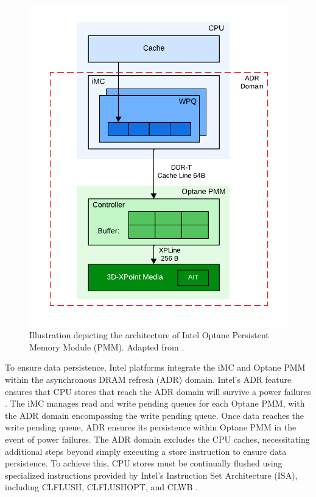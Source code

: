 \begin{figure}[ht]
    \centering
    \includegraphics[scale=0.7]{images/optane-communication.png}
    \caption[Intel Optane Persistent Memory Module Architecture]{Illustration depicting the architecture of Intel Optane Persistent Memory Module (PMM). Adapted from \cite{yang2020empirical}.}
    \label{fig:optane_communication}
\end{figure}

To ensure data persistence, Intel platforms integrate the iMC and Optane PMM within the asynchronous DRAM refresh (ADR) domain. Intel's ADR feature ensures that CPU stores that reach the ADR domain will survive a power failures \cite{yang2020empirical}. The iMC manages read and write pending queues for each Optane PMM, with the ADR domain encompassing the write pending queue. Once data reaches the write pending queue, ADR ensures its persistence within Optane PMM in the event of power failures. The ADR domain excludes the CPU caches, necessitating additional steps beyond simply executing a store instruction to ensure data persistence. To achieve this, CPU stores must be continually flushed using specialized instructions provided by Intel's Instruction Set Architecture (ISA), including \textrm{CLFLUSH}, \textrm{CLFLUSHOPT}, and \textrm{CLWB} \cite{yang2020empirical,izraelevitz2019basic,rudoff2017persistent}.

